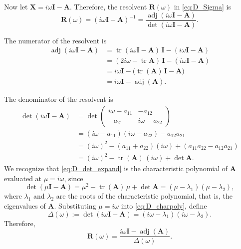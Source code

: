 \documentclass[12pt]{article}
\newcommand{\tr}{\operatorname{tr}}
\newcommand{\adj}{\operatorname{adj}}
\begin{document}
Now let $\mathbf{X}=i\omega\mathbf{I}-\mathbf{A}$. Therefore, the resolvent $\mathbf{R}(\omega)$ in \eqref{eq:D_Sigma} is
\begin{equation}
    \mathbf{R}(\omega)=(i\omega\mathbf{I}-\mathbf{A})^{-1}
    =\frac{\adj(i\omega\mathbf{I}-\mathbf{A})}{\det(i\omega\mathbf{I}-\mathbf{A})}.
    \label{eq:D_res_form}
\end{equation}

The numerator of the resolvent is
\begin{equation}
\begin{aligned}
    \adj(i\omega\mathbf{I}-\mathbf{A})
    &=\tr(i\omega\mathbf{I}-\mathbf{A})\,\mathbf{I}-(i\omega\mathbf{I}-\mathbf{A})\\
    &=(2i\omega-\tr\mathbf{A})\,\mathbf{I}-(i\omega\mathbf{I}-\mathbf{A})\\
    &=i\omega\mathbf{I}-\bigl(\tr(\mathbf{A})\,\mathbf{I}-\mathbf{A}\bigr)\\
    &=i\omega\mathbf{I}-\adj(\mathbf{A}).
\end{aligned}
    \label{eq:D_adj_res}
\end{equation}

The denominator of the resolvent is
\begin{equation}
\begin{aligned}
    \det(i\omega\mathbf{I}-\mathbf{A})
    &=\det\begin{pmatrix}i\omega-a_{11}&-a_{12}\\-a_{21}&i\omega-a_{22}\end{pmatrix}\\
    &=(i\omega-a_{11})(i\omega-a_{22})-a_{12}a_{21}\\
    &=(i\omega)^2-(a_{11}+a_{22})(i\omega)+(a_{11}a_{22}-a_{12}a_{21})\\
    &=(i\omega)^2-\tr(\mathbf{A})\,(i\omega)+\det\mathbf{A}.
\end{aligned}
    \label{eq:D_det_expand}
\end{equation}
We recognize that \eqref{eq:D_det_expand} is the characteristic polynomial of
$\mathbf{A}$ evaluated at $\mu=i\omega$, since
\begin{equation}
    \det(\mu\mathbf{I}-\mathbf{A})=\mu^2-\tr(\mathbf{A})\,\mu+\det\mathbf{A}=(\mu-\lambda_1)(\mu-\lambda_2),
    \label{eq:D_charpoly}
\end{equation}
where $\lambda_1$ and $\lambda_2$ are the roots of the characteristic polynomial, that is, the eigenvalues of $\mathbf{A}$.
Substituting $\mu=i\omega$ into \eqref{eq:D_charpoly}, define
\begin{equation}
    \Delta(\omega):=\det(i\omega\mathbf{I}-\mathbf{A})=(i\omega-\lambda_1)(i\omega-\lambda_2).
    \label{eq:D_Delta}
\end{equation}
Therefore,
\begin{equation}
    \mathbf{R}(\omega)=\frac{i\omega\mathbf{I}-\adj(\mathbf{A})}{\Delta(\omega)}.
    \label{eq:D_res}
\end{equation}
\end{document}
